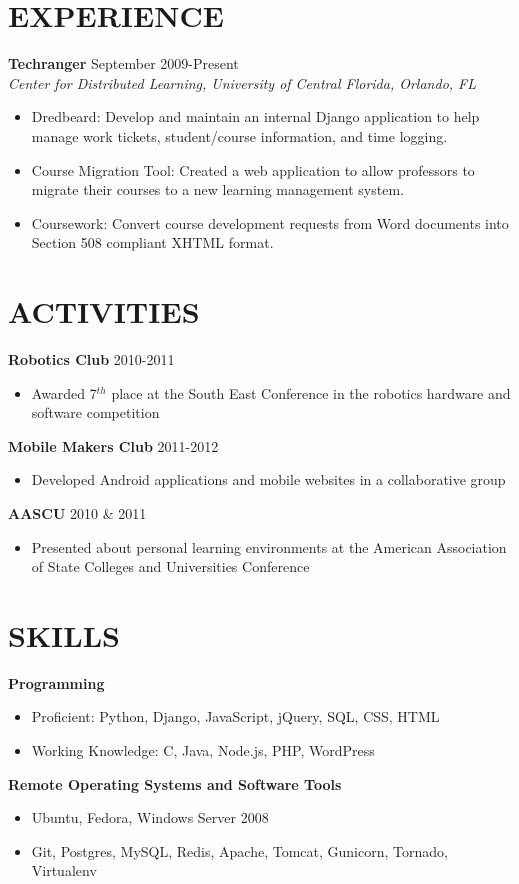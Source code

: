 \documentclass[margin]{res}
\begin{document}
\begin{resume}
\section{EXPERIENCE} 
\textbf{Techranger} \hfill September 2009-Present \\
\textit{Center for Distributed Learning, University of Central Florida, Orlando, FL} \smallskip
\begin{itemize}[leftmargin=10pt]
\item Dredbeard: Develop and maintain an internal Django application to help manage work tickets, student/course information, and time logging.
\item Course Migration Tool: Created a web application to allow professors to migrate their courses to a new learning management system.
\item Coursework: Convert course development requests from Word documents into Section 508 compliant XHTML format. 
\end{itemize}

\section{ACTIVITIES}             
\textbf{Robotics Club} \hfill 2010-2011
\begin{itemize}[leftmargin=10pt]
\itemsep -2pt %
\item Awarded 7$^{th}$ place at the South East Conference in the robotics hardware and software competition
\end{itemize}

\textbf{Mobile Makers Club} \hfill 2011-2012 
\begin{itemize}[leftmargin=10pt]
\itemsep -2pt %
\item Developed Android applications and mobile websites in a collaborative group
\end{itemize}

\textbf{AASCU} \hfill 2010 \& 2011
\begin{itemize}[leftmargin=10pt]
\itemsep -2pt %
\item Presented about personal learning environments at the American Association of State Colleges and Universities Conference
\end{itemize}

\section{SKILLS}
\textbf{Programming}
\begin{itemize}[leftmargin=10pt]
\item Proficient: Python, Django, JavaScript, jQuery, SQL, CSS, HTML
\item Working Knowledge: C, Java, Node.js, PHP, WordPress
\end{itemize}

\textbf{Remote Operating Systems and Software Tools}
\begin{itemize}[leftmargin=10pt]
\item Ubuntu, Fedora, Windows Server 2008
\item Git, Postgres, MySQL, Redis, Apache, Tomcat, Gunicorn, Tornado, Virtualenv
\end{itemize}

\end{resume}
\end{document}
